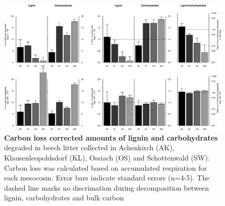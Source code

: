 \documentclass[10pt]{article}
\begin{document}
\begin{flushleft}
\newpage
\begin{figure}[h!]
\vspace*{2mm}
\begin{center}
\includegraphics{ligpaper-degrdiff}
\end{center}
\caption{
{\bf Carbon loss corrected amounts of lignin and carbohydrates} degraded in beech litter collected in Achenkirch (AK), Klausenleopoldsdorf (KL), Ossiach (OS) and Schottenwald (SW). Carbon loss was calculated based on accumulated respiration for each mesocosm. Error bars indicate standard errors (n=4-5). The dashed line marks no discrimation during decomposition between lignin, carbohydrates and bulk carbon}
\label{fig:degr}
\end{figure}


\end{flushleft}
\end{document}
